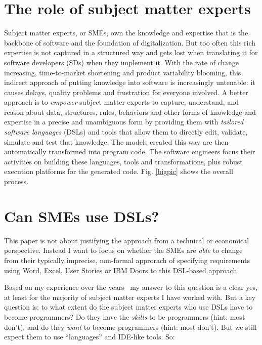 \documentclass[runningheads]{llncs}
\newcommand{\fig}[1]{Fig. \ref{#1}}  %
\begin{document}
\newcommand{\datev}{DATEV}
\newcommand{\voluntis}{Voluntis}
\newcommand{\ohb}{OHB}

\newcommand{\caseend}{$\blacksquare$}

 


\section{The role of subject matter experts}

Subject matter experts, or SMEs, own the knowledge and expertise that is the
backbone of software and the foundation of digitalization. But too often this
rich expertise is not captured in a structured way and gets lost when
translating it for software developers (SDs) when they implement it. With the
rate of change increasing, time-to-market shortening and product variability
blooming, this indirect approach of putting knowledge into software is
increasingly untenable: it causes delays, quality problems and frustration for
everyone involved. A better approach is to \emph{empower} subject matter experts
to capture, understand, and reason about data, structures, rules, behaviors and
other forms of knowledge and expertise in a precise and unambiguous form by
providing them with \emph{tailored software languages} (DSLs) and tools that
allow them to directly edit, validate, simulate and test that knowledge. The
models created this way are then automatically transformed into program code.
The software engineers focus their activities on building these
languages, tools and transformations, plus robust execution platforms for the
generated code. \fig{bigpic} shows the overall process.

\section{Can SMEs use DSLs?}

This paper is not about justifying the approach from a technical or economical
perspective. Instead I want to focus on whether the SMEs are \emph{able} to
change from their typically imprecise, non-formal approrach of specifying
requirements using Word, Excel, User Stories or IBM Doors to this DSL-based
approach.

Based on my experience over the years~\cite{infoq} my
answer to this question is a clear yes, at least for the majority
of subject matter experts I have worked with. But a key question is: to what
extent do the subject matter experts who use DSLs have to become
programmers? Do they have the \emph{skills} to be programmers (hint: most
don't), and do they \emph{want} to become programmers (hint: most don't). But we
still expect them to use ``languages'' and IDE-like tools. So:
\end{document}
